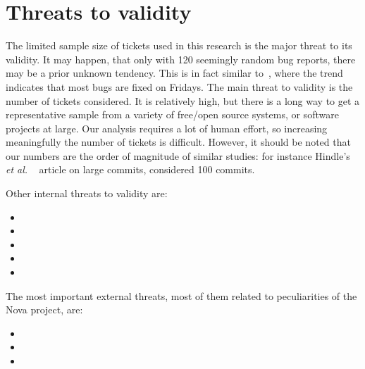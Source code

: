 \documentclass[a4paper, 12pt]{book}
\begin{document}
\section{Threats to validity}
\label{sec:threats}

The limited sample size of tickets used in this research is the major threat to its validity. It may happen, that only with 120 seemingly random bug reports, there may be a prior unknown tendency. This is in fact similar to~\cite{sliwerski2005changes}, where the trend indicates that most bugs are fixed on Fridays.
The main threat to validity is the number of tickets considered. It is relatively high, but there is a long way to get a representative sample from a variety of free/open source systems, or software projects at large. Our analysis requires a lot of human effort, so increasing meaningfully the number of tickets is difficult. However, it should be noted that our numbers are the order of magnitude of similar studies: for instance Hindle's \emph{et al.} ~\cite{hindle2008large} article on large commits, considered 100 commits.

Other internal threats to validity are:

\begin{itemize}
    \item
    \item 
    \item
    \item 
    \item
\end{itemize}

The most important external threats, most of them related to peculiarities of the Nova project, are:

\begin{itemize}
    \item 
    \item 
    \item 
\end{itemize}
\end{document}
